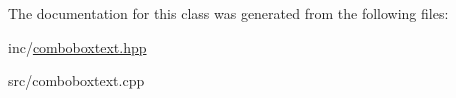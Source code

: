 The documentation for this class was generated from the following files\+:\begin{DoxyCompactItemize}
\item 
inc/\hyperlink{comboboxtext_8hpp}{comboboxtext.\+hpp}\item 
src/comboboxtext.\+cpp\end{DoxyCompactItemize}
